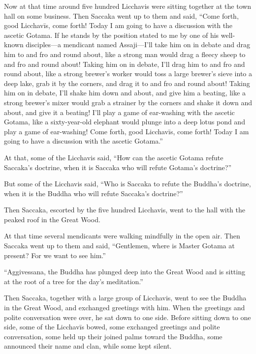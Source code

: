 \documentclass[12pt,openany]{book}%
\begin{document}
Now at that time around five hundred Licchavis were sitting together at the town hall on some business. Then Saccaka went up to them and said, “Come forth, good \textsanskrit{Licchavīs}, come forth! Today I am going to have a discussion with the ascetic Gotama. If he stands by the position stated to me by one of his well-known disciples—a mendicant named Assaji—I’ll take him on in debate and drag him to and fro and round about, like a strong man would drag a fleecy sheep to and fro and round about! Taking him on in debate, I’ll drag him to and fro and round about, like a strong brewer’s worker would toss a large brewer’s sieve into a deep lake, grab it by the corners, and drag it to and fro and round about! Taking him on in debate, I’ll shake him down and about, and give him a beating, like a strong brewer’s mixer would grab a strainer by the corners and shake it down and about, and give it a beating! I’ll play a game of ear-washing with the ascetic Gotama, like a sixty-year-old elephant would plunge into a deep lotus pond and play a game of ear-washing! Come forth, good \textsanskrit{Licchavīs}, come forth! Today I am going to have a discussion with the ascetic Gotama.” 

At that, some of the Licchavis said, “How can the ascetic Gotama refute Saccaka’s doctrine, when it is Saccaka who will refute Gotama’s doctrine?” 

But some of the Licchavis said, “Who is Saccaka to refute the Buddha’s doctrine, when it is the Buddha who will refute Saccaka’s doctrine?” 

Then Saccaka, escorted by the five hundred Licchavis, went to the hall with the peaked roof in the Great Wood. 

At that time several mendicants were walking mindfully in the open air. Then Saccaka went up to them and said, “Gentlemen, where is Master Gotama at present? For we want to see him.” 

“Aggivessana, the Buddha has plunged deep into the Great Wood and is sitting at the root of a tree for the day’s meditation.” 

Then Saccaka, together with a large group of Licchavis, went to see the Buddha in the Great Wood, and exchanged greetings with him. When the greetings and polite conversation were over, he sat down to one side. Before sitting down to one side, some of the \textsanskrit{Licchavīs} bowed, some exchanged greetings and polite conversation, some held up their joined palms toward the Buddha, some announced their name and clan, while some kept silent. 
\end{document}
